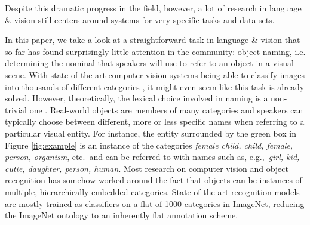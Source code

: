 \documentclass[runningheads]{llncs}
\begin{document}
Despite this dramatic progress in the field, however, a lot of research in language \& vision still centers around systems for very specific tasks and data sets.

In this paper, we take a look at a straightforward task in language \& vision that so far has found surprisingly little attention in the community: object naming, i.e. determining the nominal that speakers will use to refer to an object in a visual scene. 
With state-of-the-art computer vision systems being able to classify images into thousands of different categories \cite{googlenet}, it might even seem like this task is already solved.
However, theoretically, the lexical choice involved in naming is a non-trivial one \cite{brown1958shall}.
Real-world objects are members of many categories and speakers can typically choose between different, more or less specific names when referring to a particular visual entity. 
For instance, the entity surrounded by the green box in Figure \ref{fig:example} is an instance of the categories \textit{female child, child, female, person, organism}, etc.\  and can be referred to with names such as, e.g.,\ \textit{girl, kid, cutie, daughter, person, human}.
Most research on computer vision and object recognition has somehow worked around the fact that objects can be instances of multiple, hierarchically embedded categories. 
State-of-the-art recognition models are mostly trained as classifiers on a flat of 1000 categories in ImageNet, reducing the ImageNet ontology to an inherently flat annotation scheme.


\end{document}
